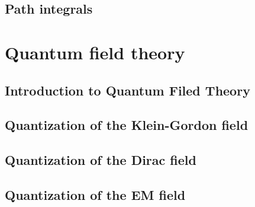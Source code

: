 \documentclass[11pt,fleqn]{book} %
\begin{document}


\chapter{Path integrals}




\part{Quantum field theory}\label{part:QFT}


\chapter{Introduction to Quantum Filed Theory}



\chapter{Quantization of the Klein-Gordon field}



\chapter{Quantization of the Dirac field}



\chapter{Quantization of the EM field}





\end{document}
